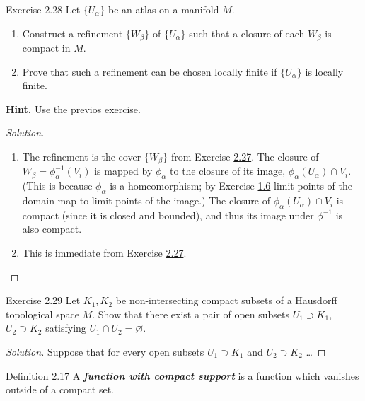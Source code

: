\begin{thing4}{Exercise 2.28}\label{exer:2.28}\leavevmode
Let \(\{U_\alpha\}\) be an atlas on a manifold \(M\).
\begin{enumerate}[label=(\alph*)]
\item Construct a refinement \(\{W_\beta\}\) of \(\{U_\alpha\}\) such that a closure of each \(W_\beta\) is compact in \(M\).
\item Prove that such a refinement can be chosen locally finite if \(\{U_\alpha\}\) is locally finite.
\end{enumerate}
\textbf{Hint.} Use the previos exercise.
\end{thing4}

\begin{proof}[Solution]\leavevmode
\begin{enumerate}[label=(\alph*)]
\item The refinement is the cover \(\{W_\beta\}\) from Exercise \hyperref[exer:2.27]{2.27}. 
The closure of \(W_\beta=\phi^{-1}_\alpha(V_i)\) is mapped by \(\phi_\alpha\) to the closure of its image, \(\phi_\alpha(U_\alpha)\cap V_i\). (This is because  \(\phi_\alpha\) is a homeomorphism; by Exercise \hyperref[exer:1.6]{1.6} limit points of the domain map to limit points of the image.) The closure of \(\phi_\alpha(U_\alpha)\cap V_i\) is compact (since it is closed and bounded), and thus its image under \(\phi^{-1}\) is also compact.

\item This is immediate from Exercise \hyperref[exer:2.27]{2.27}.
\end{enumerate}
\end{proof}

\begin{thing4}{Exercise 2.29}\label{exer:2.29}\leavevmode
Let \(K_1, K_2\) be non-intersecting compact subsets of a Hausdorff topological space \(M\). Show that there exist a pair of open subsets \(U_1 \supset K_1\), \(U_2 \supset K_2\) satisfying \(U_1 \cap U_2=\varnothing\).
\end{thing4}

\begin{proof}[Solution]\leavevmode
Suppose that for every open subsets \(U_1 \supset K_1\) and \(U_2 \supset K_2\) {\color{2}…}
\end{proof}

\begin{thing3}{Definition 2.17}\label{def:2.17}\leavevmode
A \textit{\textbf{function with compact support}} is a function which vanishes outside of a compact set.
\end{thing3}

